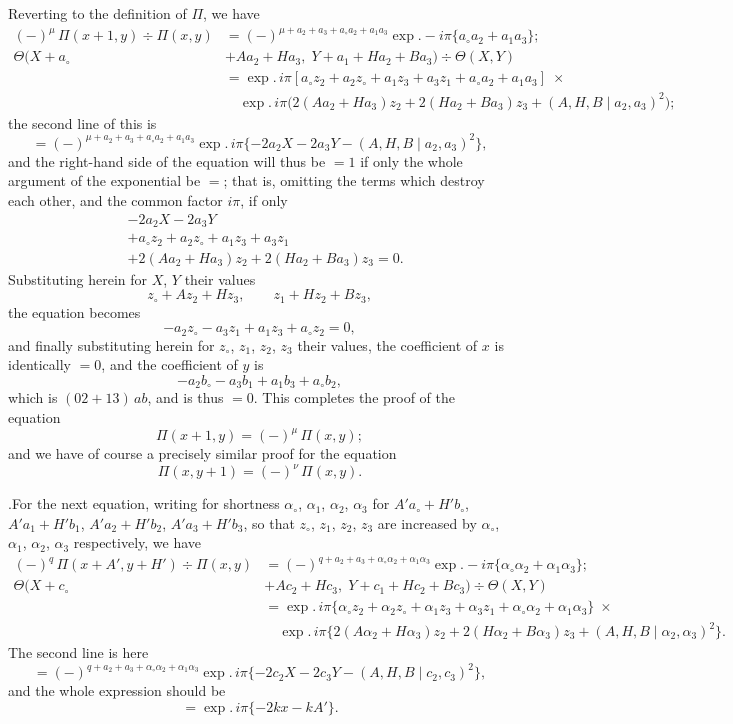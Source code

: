 \documentclass[11pt]{article}
\begin{document}
Reverting to the definition of $\Pi$, we have
\begin{align*}
(-)^{\mu}\,\Pi(x+1,y) \div \Pi(x,y) &= (-)^{\mu+a_2+a_3+a_{\circ}a_2+a_1a_3}\exp.-i\pi\{a_{\circ}a_2+a_1a_3\};\\
\Theta(X+a_{\circ}&+Aa_2+Ha_3,\; Y+a_1+Ha_2+Ba_3)\div\Theta(X,Y)\\
&= \exp.\,i\pi[a_{\circ}z_2+a_2z_{\circ}+a_1z_3+a_3z_1+a_{\circ}a_2+a_1a_3]\;\times\\
&\quad \exp.\,i\pi\bigl(2(Aa_2+Ha_3)z_2+2(Ha_2+Ba_3)z_3+(A,H,B\mid a_2,a_3)^2\bigr);
\end{align*}
the second line of this is
\[
= (-)^{\mu+a_2+a_3+a_{\circ}a_2+a_1a_3}\exp.\,i\pi\{-2a_2X-2a_3Y-(A,H,B\mid a_2,a_3)^2\},
\]
and the right-hand side of the equation will thus be $=1$ if only the whole argument of the exponential be $=$; that is, omitting the terms which destroy each other, and the common factor $i\pi$, if only
\begin{align*}
&-2a_2X-2a_3Y\\
&+ a_{\circ}z_2+a_2z_{\circ}+a_1z_3+a_3z_1\\
&+ 2(Aa_2+Ha_3)z_2+2(Ha_2+Ba_3)z_3 = 0.
\end{align*}
Substituting herein for $X$, $Y$ their values
\[
z_{\circ}+Az_2+Hz_3,\qquad z_1+Hz_2+Bz_3,
\]
the equation becomes
\[
-a_2z_{\circ}-a_3z_1+a_1z_3+a_{\circ}z_2 = 0,
\]
and finally substituting herein for $z_{\circ}$, $z_1$, $z_2$, $z_3$ their values, the coefficient of $x$ is identically $=0$, and the coefficient of $y$ is
\[
-a_2b_{\circ}-a_3b_1+a_1b_3+a_{\circ}b_2,
\]
which is $(02+13)\,ab$, and is thus $=0$. This completes the proof of the equation
\[
\Pi(x+1,y) = (-)^{\mu}\,\Pi(x,y);
\]
and we have of course a precisely similar proof for the equation
\[
\Pi(x,y+1) = (-)^{\nu}\,\Pi(x,y).
\]

\medskip

.\quad For the next equation, writing for shortness $\alpha_{\circ}$, $\alpha_1$, $\alpha_2$, $\alpha_3$ for $A'a_{\circ}+H'b_{\circ}$, $A'a_1+H'b_1$, $A'a_2+H'b_2$, $A'a_3+H'b_3$, so that $z_{\circ}$, $z_1$, $z_2$, $z_3$ are increased by $\alpha_{\circ}$, $\alpha_1$, $\alpha_2$, $\alpha_3$ respectively, we have
\begin{align*}
(-)^q\,\Pi(x+A',y+H') \div \Pi(x,y) &= (-)^{q+a_2+a_3+\alpha_{\circ}\alpha_2+\alpha_1\alpha_3}\exp.-i\pi\{\alpha_{\circ}\alpha_2+\alpha_1\alpha_3\};\\
\Theta(X+c_{\circ}&+Ac_2+Hc_3,\; Y+c_1+Hc_2+Bc_3)\div\Theta(X,Y)\\
&= \exp.\,i\pi\{\alpha_{\circ}z_2+\alpha_2z_{\circ}+\alpha_1z_3+\alpha_3z_1+\alpha_{\circ}\alpha_2+\alpha_1\alpha_3\}\;\times\\
&\quad \exp.\,i\pi\{2(A\alpha_2+H\alpha_3)z_2+2(H\alpha_2+B\alpha_3)z_3+(A,H,B\mid \alpha_2,\alpha_3)^2\}.
\end{align*}
The second line is here
\[
= (-)^{q+a_2+a_3+\alpha_{\circ}\alpha_2+\alpha_1\alpha_3}\exp.\,i\pi\{-2c_2X-2c_3Y-(A,H,B\mid c_2,c_3)^2\},
\]
and the whole expression should be
\[
= \exp.\,i\pi\{-2kx-kA'\}.
\]
\end{document}
